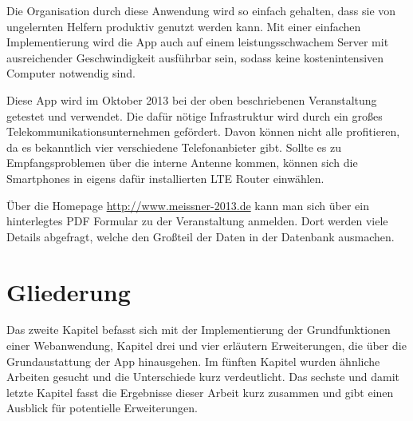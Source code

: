 Die Organisation durch diese Anwendung wird so einfach gehalten, dass sie von ungelernten Helfern produktiv genutzt werden kann. Mit einer einfachen Implementierung wird die App auch auf einem leistungsschwachem Server mit ausreichender Geschwindigkeit ausführbar sein, sodass keine kostenintensiven Computer notwendig sind.\par

Diese App wird im Oktober 2013 bei der oben beschriebenen Veranstaltung getestet und verwendet. Die dafür nötige Infrastruktur wird durch ein großes Telekommunikationsunternehmen gefördert. Davon können nicht alle profitieren, da es bekanntlich vier verschiedene Telefonanbieter gibt. Sollte es zu Empfangsproblemen über die interne Antenne kommen, können sich die Smartphones in eigens dafür installierten LTE Router einwählen.\par

Über die Homepage \url{http://www.meissner-2013.de} kann man sich über ein hinterlegtes PDF Formular zu der Veranstaltung anmelden. Dort werden viele Details abgefragt, welche den Großteil der Daten in der Datenbank ausmachen.

\section{Gliederung}
Das zweite Kapitel befasst sich mit der Implementierung der Grundfunktionen einer Webanwendung, Kapitel drei und vier erläutern Erweiterungen, die über die Grundaustattung der App hinausgehen. Im fünften Kapitel wurden ähnliche Arbeiten gesucht und die Unterschiede kurz verdeutlicht. Das sechste und damit letzte Kapitel fasst die Ergebnisse dieser Arbeit kurz zusammen und gibt einen Ausblick für potentielle Erweiterungen. 